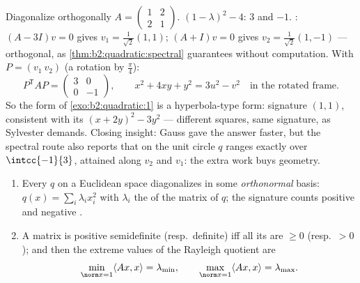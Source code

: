 \begin{example}\label{ex:b2:quadratic:fullrun}
Diagonalize orthogonally $A = \begin{pmatrix} 1 & 2\\ 2 &
1\end{pmatrix}$.  $(1 - \lambda)^2 -
4$:  $3$ and $-1$. : $(A - 3I)v = 0$
gives $v_1 = \frac{1}{\sqrt2}(1,1)$; $(A + I)v = 0$ gives $v_2
= \frac{1}{\sqrt2}(1,-1)$ --- orthogonal, as
\cref{thm:b2:quadratic:spectral} guarantees without
computation. With $P = (v_1\ v_2)$ (a rotation by
$\frac\pi4$):
\[
P^{\mathsf T}AP = \begin{pmatrix} 3 & 0\\ 0 & -1
\end{pmatrix},
\qquad
x^2 + 4xy + y^2 = 3u^2 - v^2
\quad\text{in the rotated frame} .
\]
So the form of \cref{exo:b2:quadratic:1} is a hyperbola-type
form: signature $(1,1)$, consistent with its 
$(x + 2y)^2 - 3y^2$ --- different squares, same signature, as
Sylvester demands. Closing insight: Gauss gave the answer
faster, but the spectral route also reports that on the unit
circle $q$ ranges exactly over $\intcc{-1}{3}$, attained along
$v_2$ and $v_1$: the extra work buys geometry.
\end{example}

\begin{corollary}\label{cor:b2:quadratic:principalaxes}
\begin{enumerate}
  \item Every  $q$ on a Euclidean space diagonalizes
        in some \emph{orthonormal} basis: $q(x) = \sum_i \lambda_i
        x_i^2$ with $\lambda_i$ the  of the 
        matrix of $q$; the signature counts positive and negative
        .
  \item A  matrix is positive semidefinite (resp.\
        definite) iff all its  are $\geq 0$ (resp.\ $>
        0$); and then the extreme values of the Rayleigh quotient
        are
        \[
        \min_{\norm x = 1} \langle Ax, x\rangle = \lambda_{\min},
        \qquad
        \max_{\norm x = 1} \langle Ax, x\rangle = \lambda_{\max} .
        \]
\end{enumerate}
\end{corollary}

